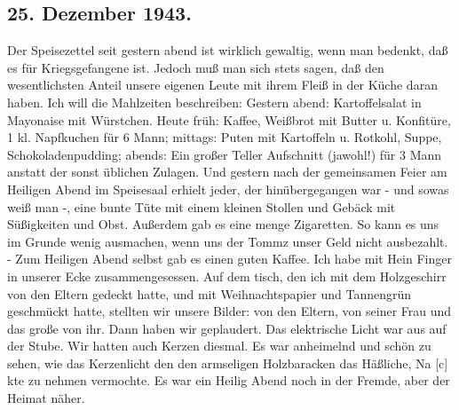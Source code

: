 \subsection{25. Dezember 1943.}

Der Speisezettel seit gestern abend ist wirklich gewaltig, wenn man bedenkt, da{\ss} es f\"{u}r Kriegsgefangene ist.
Jedoch mu{\ss} man sich stets sagen, da{\ss} den wesentlichsten Anteil unsere eigenen Leute mit ihrem Flei{\ss} in der K\"{u}che daran haben.
Ich will die Mahlzeiten beschreiben: Gestern abend: Kartoffelsalat in Mayonaise mit W\"{u}rstchen.
Heute fr\"{u}h: Kaffee, Wei{\ss}brot mit Butter u. Konfit\"{u}re, 1 kl. Napfkuchen f\"{u}r 6 Mann; mittags: Puten mit Kartoffeln u. Rotkohl, Suppe, Schokoladenpudding; abends: Ein gro{\ss}er Teller Aufschnitt (jawohl!) f\"{u}r 3 Mann anstatt der sonst \"{u}blichen Zulagen.
Und gestern nach der gemeinsamen Feier am Heiligen Abend im Speisesaal erhielt jeder, der hin\"{u}bergegangen war - und sowas wei{\ss} man -, eine bunte T\"{u}te mit einem kleinen Stollen und Geb\"{a}ck mit S\"{u}{\ss}igkeiten und Obst.
Au{\ss}erdem gab es eine menge Zigaretten.
So kann es uns im Grunde wenig ausmachen, wenn uns der Tommz unser Geld nicht ausbezahlt. -
Zum Heiligen Abend selbst gab es einen guten Kaffee.
Ich habe mit Hein Finger in unserer Ecke zusammengesessen.
Auf dem tisch, den ich mit dem Holzgeschirr von den Eltern gedeckt hatte, und mit Weihnachtspapier und Tannengr\"{u}n geschm\"{u}ckt hatte, stellten wir unsere Bilder: von den Eltern, von seiner Frau und das gro{\ss}e von ihr.
Dann haben wir geplaudert.
Das elektrische Licht war aus auf der Stube.
Wir hatten auch Kerzen diesmal.
Es war anheimelnd und sch\"{o}n zu sehen, wie das Kerzenlicht den den armseligen Holzbaracken das H\"{a}{\ss}liche, Na{\color{red} [c] }kte zu nehmen vermochte.
Es war ein Heilig Abend noch in der Fremde, aber der Heimat n\"{a}her.

\clearpage
